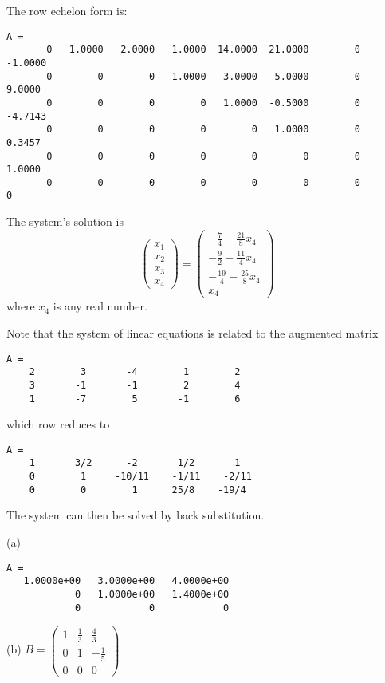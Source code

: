 \documentclass{ximera}
\begin{document}
\newpage
{} The row echelon form is:
\begin{verbatim}
A = 
       0   1.0000   2.0000   1.0000  14.0000  21.0000        0  -1.0000
       0        0        0   1.0000   3.0000   5.0000        0   9.0000
       0        0        0        0   1.0000  -0.5000        0  -4.7143
       0        0        0        0        0   1.0000        0   0.3457
       0        0        0        0        0        0        0   1.0000
       0        0        0        0        0        0        0        0
\end{verbatim}


\ans The system's solution is
\[
\left(\begin{array}{c} x_1 \\ x_2 \\ x_3 \\ x_4\end{array}\right) =
\left(\begin{array}{c} -\frac{7}{4} - \frac{21}{8}x_4 \\ -\frac{9}{2} -
\frac{11}{4}x_4 \\ -\frac{19}{4} - \frac{25}{8}x_4 \\ x_4\end{array}\right)
\]
where $x_4$ is any real number.

\soln Note that the system of linear equations is related to the
augmented matrix
\begin{verbatim}
A = 
    2        3       -4        1        2
    3       -1       -1        2        4
    1       -7        5       -1        6
\end{verbatim}
which row reduces to
\begin{verbatim}
A =
    1       3/2      -2       1/2       1
    0        1     -10/11    -1/11    -2/11
    0        0        1      25/8    -19/4
\end{verbatim}
The system can then be solved by back substitution.

(a)
\begin{verbatim}
A =
   1.0000e+00   3.0000e+00   4.0000e+00
            0   1.0000e+00   1.4000e+00
            0            0            0
\end{verbatim}

(b)
$B = \left(\begin{array}{rrr}
1 & \frac{1}{3} & \frac{4}{3} \\
0 & 1 & -\frac{1}{5} \\
0 & 0 & 0\end{array} \right)$
\end{document}
